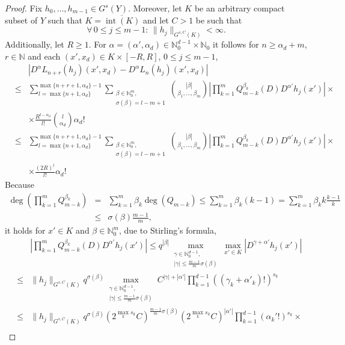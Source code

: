 \documentclass[a4paper,10pt]{amsart}
\newtheorem*{crucial lemma}{Lemma \ref{lem:nice polynomial2}}
\theoremstyle{definition}
\newcommand{\N}{\mathbb{N}}
\begin{document}
\begin{proof}
	Fix $h_0,\ldots,h_{m-1}\in G^s(Y)$. Moreover, let $K$ be an arbitrary compact subset of $Y$ such that $K=\overline{\operatorname{int}(K)}$ and let $C>1$ be such that
	$$\forall\, 0\leq j\leq m-1:\,\|h_j\|_{G^{s,C}(K)}<\infty.$$
	Additionally, let $R\geq 1$. For $\alpha=(\alpha',\alpha_d)\in\N_0^{d-1}\times\N_0$ it follows for $n\geq \alpha_d+m$, $r\in\N$ and each $(x',x_d)\in K\times [-R,R]$, $0\leq j\leq m-1$,
	\begin{eqnarray}\label{eq:convergence 1}
		&&|D^\alpha L_{n+r}(h_j)(x',x_d)-D^\alpha L_n(h_j)(x',x_d)|\nonumber\\
		&\leq& \sum_{l=\max\{n+1,\alpha_d\}}^{\max\{n+r+1,\alpha_d\}-1}\sum\limits_{\substack{\beta\in\N_0^m,\\ \sigma(\beta)=l-m+1}}\binom{|\beta|}{\beta_1,\ldots,\beta_m}\left|\prod_{k=1}^m Q_{m-k}^{\beta_k}(D)D^{\alpha'}h_j(x')\right| \times\nonumber\\
		&&\times\frac{R^{l-\alpha_d}}{l!}\binom{l}{\alpha_d}\alpha_d!\nonumber\\
		&\leq&\sum_{l=\max\{n+1,\alpha_d\}}^{\max\{n+r+1,\alpha_d\}-1}\sum\limits_{\substack{\beta\in\N_0^m,\\ \sigma(\beta)=l-m+1}}\binom{|\beta|}{\beta_1,\ldots,\beta_m}\left|\prod_{k=1}^m Q_{m-k}^{\beta_k}(D)D^{\alpha'}h_j(x')\right|\times\nonumber\\
		&&\times \frac{(2R)^l}{l!}\alpha_d!
	\end{eqnarray}
	Because
	\begin{eqnarray*}
		\operatorname{deg}\left(\prod_{k=1}^m Q_{m-k}^{\beta_k}\right)&=&\sum_{k=1}^{m}\beta_k\operatorname{deg}(Q_{m-k})\leq \sum_{k=1}^{m}\beta_k(k-1)=\sum_{k=1}^{m}\beta_k k\frac{k-1}{k}\\
		&\leq&\sigma(\beta)\frac{m-1}{m},
	\end{eqnarray*}
	it holds for $x'\in K$ and $\beta\in\N_0^m$, due to Stirling's formula,
	\begin{eqnarray*}
		&&\left|\prod_{k=1}^m Q_{m-k}^{\beta_k}(D)D^{\alpha'}h_j(x')\right| \leq q^{|\beta|}\max_{\substack{\gamma\in\N_0^{d-1},\\ |\gamma|\leq \frac{m-1}{m}\sigma(\beta)}}\max_{x'\in K}\left|D^{\gamma+\alpha'}h_j(x')\right|\\
		&\leq&\|h_j\|_{G^{s,C}(K)}  q^{\sigma(\beta)} \max_{\substack{\gamma\in\N_0^{d-1},\\ |\gamma|\leq \frac{m-1}{m}\sigma(\beta)}}C^{|\gamma|+|\alpha'|}\prod_{k=1}^{d-1}\left((\gamma_k+\alpha'_k)!\right)^{s_k}\\
		&\leq& \|h_j\|_{G^{s,C}(K)}  q^{\sigma(\beta)} (2^{\max_k s_k} C)^{\frac{m-1}{m}\sigma(\beta)}(2^{\max_k s_k} C)^{|\alpha'|}\prod_{k=1}^{d-1}\left(\alpha_k'!\right)^{s_k}\times\\

\end{eqnarray*}
\end{proof}
\end{document}
